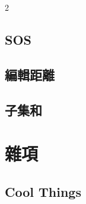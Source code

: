 \documentclass[10pt,a4paper]{article}
\begin{document}
\begin{multicols}{2}
\subsection{SOS}

\subsection{編輯距離}

\subsection{子集和}


\section{雜項}

\subsection{Cool Things}


\end{multicols}
\end{document}
